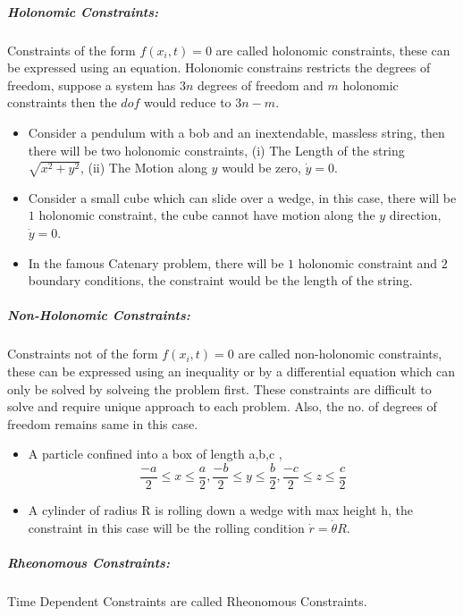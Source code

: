 \documentclass[a4paper]{article}
\newcounter{subsubparagraph}
\begin{document}
		\subparagraph*{Holonomic Constraints: }
			Constraints of the form $f(x_i, t) = 0$ are called holonomic constraints, these can be expressed using an equation. Holonomic constrains restricts the degrees of freedom, suppose a system has $3n$ degrees of freedom and $m$ holonomic constraints then the $dof$ would reduce to $3n - m$.
			

			\begin{itemize}
				\item Consider a pendulum with a bob and an inextendable, massless string, then there will be two holonomic constraints, (i) The Length of the string $\sqrt{x^2+y^2}$, (ii) The Motion along $y$ would be zero, $\dot{y} = 0$.
				\item Consider a small cube which can slide over a wedge, in this case, there will be $1$ holonomic constraint, the cube cannot have motion along the $y$ direction, $\dot{y}=0$.
				\item In the famous Catenary problem, there will be $1$ holonomic constraint and $2$ boundary conditions, the constraint would be the length of the string.
			\end{itemize}

		\subparagraph*{Non-Holonomic Constraints: }
			Constraints not of the form $f(x_i, t) = 0$ are called non-holonomic constraints, these can be expressed using an inequality or by a differential equation which can only be solved by solveing the problem first. These constraints are difficult to solve and require unique approach to each problem. Also, the no. of degrees of freedom remains same in this case.


			\begin{itemize}
				\item A particle confined into a box of length a,b,c , \[\frac{-a}{2}\leq x \leq \frac{a}{2}, \frac{-b}{2}\leq y \leq\frac{b}{2}, \frac{-c}{2}\leq z \leq \frac{c}{2}\]			
				\item A cylinder of radius R is rolling down a wedge with max height h, the constraint in this case will be the rolling condition $\dot{r} = \dot{\theta} R$.
			\end{itemize}
		
		\subparagraph*{Rheonomous Constraints: }
			Time Dependent Constraints are called Rheonomous Constraints.

\end{document}
